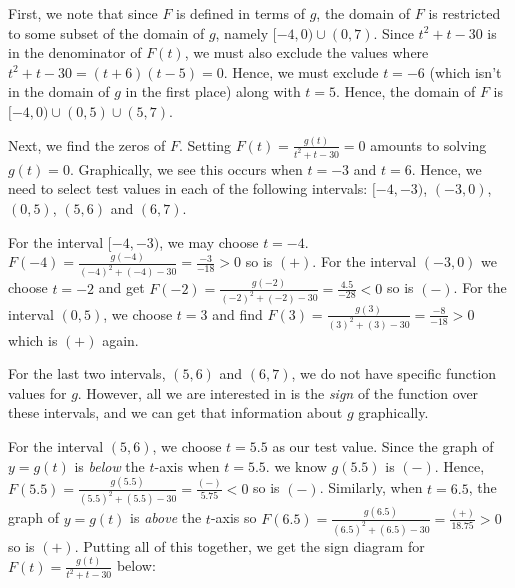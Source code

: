 \documentclass{ximera}
\begin{document}
\begin{example}
\begin{enumerate}
\smallskip

First, we note that since $F$ is defined in terms of $g$, the domain of $F$ is restricted to some subset of the domain of $g$, namely $[-4, 0) \cup (0, 7)$.  Since  $t^2+t-30$ is in the denominator of $F(t)$, we must also exclude the values where $t^2+t-30 = (t+6)(t-5) = 0$.  Hence, we must exclude $t = -6$ (which isn't in the domain of $g$ in the first place) along with $t = 5$.  Hence, the domain of $F$ is $[-4, 0) \cup (0, 5) \cup (5,7)$.

\smallskip

Next, we find the zeros of $F$.  Setting $F(t) = \frac{g(t)}{t^2+t-30} = 0$ amounts to solving $g(t) = 0$. Graphically, we see this occurs when $t = -3$ and $t = 6$.  Hence, we need to select test values in each of the following intervals:  $[-4, -3)$, $(-3,0)$, $(0,5)$, $(5,6)$ and $(6, 7)$.  

\smallskip

For the interval $[-4,-3)$, we may choose $t=-4$.  $F(-4) = \frac{g(-4)}{(-4)^2+(-4)-30} = \frac{-3}{-18}>0$ so is $(+)$.  For the interval $(-3,0)$ we choose $t = -2$ and get $F(-2) = \frac{g(-2)}{(-2)^2+(-2) - 30} = \frac{4.5}{-28} < 0$ so is $(-)$.  For the interval $(0,5)$, we choose $t = 3$ and find $F(3) = \frac{g(3)}{(3)^2+(3) - 30} = \frac{-8}{-18}>0$ which is $(+)$ again.  

\smallskip

For the last two intervals, $(5,6)$ and $(6,7)$, we do not have specific function values for $g$.  However, all we are interested in is the \textit{sign} of the function over these intervals, and we can get that information about $g$ graphically.  

\smallskip

For the interval $(5,6)$, we choose $t = 5.5$ as our test value.  Since the graph of $y=g(t)$ is \textit{below} the $t$-axis when $t = 5.5$. we know $g(5.5)$ is $(-)$.  Hence, $F(5.5) = \frac{g(5.5)}{(5.5)^2+(5.5)-30} = \frac{(-)}{5.75}<0$ so is $(-)$.  Similarly, when $t = 6.5$, the graph of $y = g(t)$ is \textit{above} the $t$-axis so $F(6.5) = \frac{g(6.5)}{ (6.5)^2+(6.5)-30} = \frac{(+)}{18.75}>0$ so is $(+)$.  Putting all of this together, we get the sign diagram for $F(t) =  \frac{g(t)}{t^2+t-30}$ below:

\begin{center}


\end{center}
\end{enumerate}
\end{example}
\end{document}
